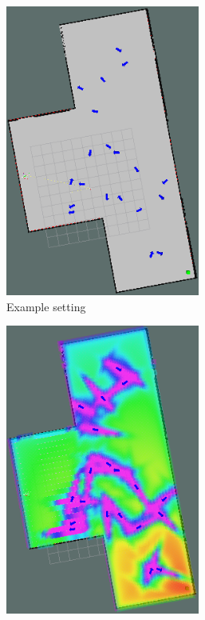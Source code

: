 \documentclass{article}  %
\begin{document}
	\begin{figure}[tbh]

      \begin{subfigure}[b]{0.435\columnwidth}
	\hspace{5mm}
    \includegraphics[width=0.7\textwidth]{images/people.png}
    \caption{Example setting }
    \label{fig:exp_setting}
  \end{subfigure}
  \hspace{10mm}
  \begin{subfigure}[b]{0.435\columnwidth}
  \hspace{4mm}
    \includegraphics[width=0.7\textwidth]{images/cost_f.png}

\end{subfigure}
\end{figure}
\end{document}
